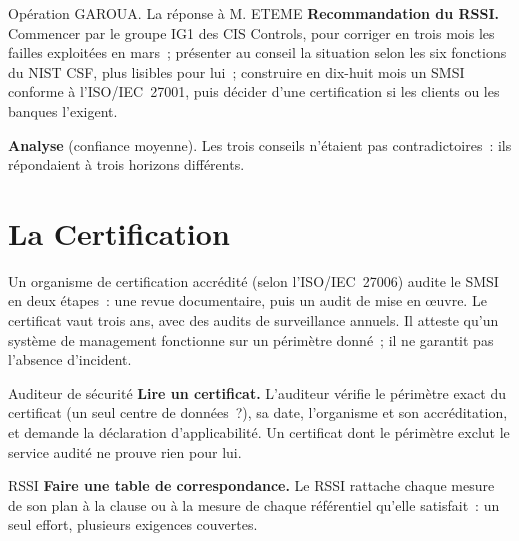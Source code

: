 \begin{boxscenario}{Opération GAROUA. La réponse à M. ETEME}
\textbf{Recommandation du RSSI.} Commencer par le groupe IG1 des CIS
Controls, pour corriger en trois mois les failles exploitées en mars~;
présenter au conseil la situation selon les six fonctions du NIST CSF,
plus lisibles pour lui~; construire en dix-huit mois un SMSI conforme à
l'ISO/IEC~27001, puis décider d'une certification si les clients ou les
banques l'exigent.

\medskip
\textbf{Analyse} (confiance moyenne). Les trois conseils n'étaient pas
contradictoires~: ils répondaient à trois horizons différents.
\end{boxscenario}

\section{La Certification}
\label{sec:c10-certif}

Un organisme de certification accrédité (selon l'ISO/IEC~27006) audite le
SMSI en deux étapes~: une revue documentaire, puis un audit de mise en
œuvre. Le certificat vaut trois ans, avec des audits de surveillance
annuels. Il atteste qu'un système de management fonctionne sur un
périmètre donné~; il ne garantit pas l'absence d'incident.

\begin{boxmetier}{Auditeur de sécurité}
\textbf{Lire un certificat.} L'auditeur vérifie le périmètre exact du
certificat (un seul centre de données~?), sa date, l'organisme et son
accréditation, et demande la déclaration d'applicabilité. Un certificat
dont le périmètre exclut le service audité ne prouve rien pour lui.
\end{boxmetier}

\begin{boxmetier}{RSSI}
\textbf{Faire une table de correspondance.} Le RSSI rattache chaque
mesure de son plan à la clause ou à la mesure de chaque référentiel
qu'elle satisfait~: un seul effort, plusieurs exigences couvertes.
\end{boxmetier}

\separateur

